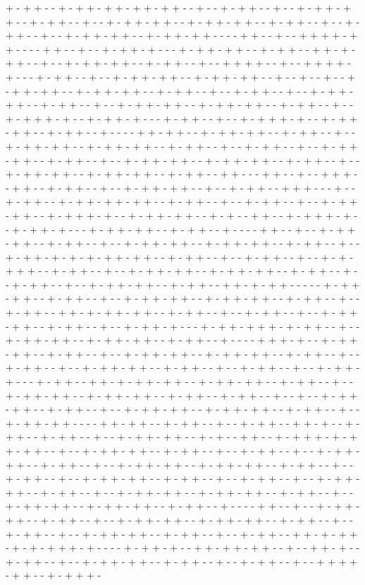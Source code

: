 + - + + - - + - + + - + + - + + - + + - - + - - + - + + - - + - - + - + + - + + - - + - + + - - + - - + - + + - + + - - + - + + - + + - - + - + + - - + - - + - + + - - + - - + - + + - + + - - + - + + - + + - - - - + + - - + - - + + + + - + + - - - - + + - - + - - + - + + - + - - - + - + + - + + - - + - + + - - + + - + - + + - - + - - + - + + - + + - - + - + + - - + - - + + + + - - + - - + + + + - + - - - + - + + - - + - - + - + + - + + - - + - + + - + + - - + - - + - - + - - + - + + - + + - - + - + + - + + - - + - + + - - + - - + - + + - - + - - + - + + - + + - - + - + + - - + - - + - + + - + + - - + - + + - + + - - + - + + - - + - - + - + + + - + - - + - + + - + - - - + - + + - - + - - + - + + + - + - - + - + + - + + - - + - + + - - + - - - - + + - + + - - + - + + - + + - - + - + + - - + - - + - + + - + + - - + - + + - + + - - + - + + - - + - - + - + + - - + - - + - + + - + + - - + - + + - - + - - + - + + - + + - - + - + + - + + - - + - + + - - + - - + - + + - + + - - + - + + - + + - - + - + + - - + + - - - + + - - + - - + + + - - + + - - + - + + - - + - - + - + + - + + - - + - - + - + + - - + + + - - - + - - + - + + - - + - + + - + + - + + - - + - + + - - + - - + - + + - - + - - + - + + - + + - - + - + + + - + - - + - + + - + + - - + - + - - + + - - + - + + + - + - - + - + + - + - - - + - + + - + + - - + - + + - - + - - - - + + - - + - - + - + + - + + - - + - + + - - + - - + - + + - + + - - + - + + - + + - - + - + + - - + - - + - + + - + - + - + - + + - + + - - + - + + - - + - - + - + + - - + - - + - + - + + + - - + - + + - - + - - + - + + - + + - - + - + + - + + - - + - + + - - + - - + - + + - - + - - + - + + - + + - - + - + + - - + + - + - + + - - - - - + - + + - + + - - + - + + - - + - - + - + + - + + - - + - + + - + + - - + - + + - - + - - + - + + - - + + - + - + + - + + - - + - + + - - + - - + - + + - - + - - + - + + - + + - - + - + + - - + - - + - + + - + - - - + - + + - + + + - + - + + - - + - - + - + + - + + - - + - + + - + + - - + - + + - - + - - - - + + + - + - - + - + + - + + - - + - + + - - + - - + - + + - + + - - + - + + - + + - - + - + + - - + - - + - + + - - + - - + - + + - + + - - + - + + - - + - - + - + + - - + - - + - + + - + - - - + - + + - - + + - + - + + - + + - - + - + + - + + - - + - + + - - + - - + - + + - + + - - + - + + - + + - - + - + + - - + - + + - - + - - + - - + - + + - + + - - + - + + - - + - - + - + + - + + - - + - + + - + + - - + - + + - - + - - + - + + - + + - - - - + + - + + - - + - + + - - + - - + - + + - - + + - + - - + - + + - - + - + + - - + - - + - + + - + + - - + - + - - + + - - + - + + + - + - + + - + + - - + - - + - + + - + + - - + - + + - - + - - + - + + - - + - - + - + + - + + - - + - + + - - + - - + - + + - + + - - + - + + - + + - - + - + + - - + - - + - + + - - + - - + - + + - + + - - + - + + - - + - - + - + + - - + - - + - + + - + + - - + - + + - - + - - + - + + - + + - - + - + + - + + - - + - + + - - + - - + - + + - + + - - + - + + - + + - - + - + + - - + - - - - + + - - + - - + - + + - + + - - + - + + - - + - - + - + + - + + - - + - + + - + + - - + - + + - - + - - + - + + - - + - - + - + + - + + - - + - + + - - + - - + - + + - - + + - + - + + - + - + - + + + - + - - - - + - + + - + - - + + - + + - + + - - + - - + + - + - - + - + + - - + - - + - + + - + + - - + - + + - - + - - + - + + - - + - - + + + + - + + - - + - + + + - 